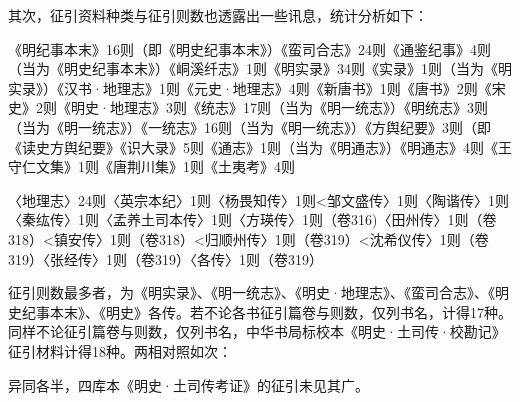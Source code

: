 其次，征引资料种类与征引则数也透露出一些讯息，统计分析如下：

《明纪事本末》16则（即《明史纪事本末》）《蛮司合志》24则《通鉴纪事》4则（当为《明史纪事本末》）《峒溪纤志》1则《明实录》34则《实录》1则（当为《明实录》）《汉书·地理志》1则《元史·地理志》4则《新唐书》1则《唐书》2则《宋史》2则《明史·地理志》3则《统志》17则（当为《明一统志》）《明统志》3则（当为《明一统志》）《一统志》16则（当为《明一统志》）《方舆纪要》3则（即《读史方舆纪要》《识大录》5则《通志》1则（当为《明通志》）《明通志》4则《王守仁文集》1则《唐荆川集》1则《土夷考》4则


\noindent 〈地理志〉24则〈英宗本纪〉1则〈杨畏知传〉1则<邹文盛传〉1则〈陶谐传〉1则〈秦纮传〉1则〈孟养土司本传〉1则〈方瑛传〉1则（卷316)〈田州传〉1则（卷318）<镇安传〉1则（卷318）<归顺州传〉1则（卷319）<沈希仪传〉1则（卷319）〈张经传〉1则（卷319）〈各传〉1则（卷319）

征引则数最多者，为《明实录》、《明一统志》、《明史·地理志》、《蛮司合志》、《明史纪事本末》、《明史》各传。若不论各书征引篇卷与则数，仅列书名，计得17种。同样不论征引篇卷与则数，仅列书名，中华书局标校本《明史·土司传·校勘记》征引材料计得18种。两相对照如次：

\par


\par

\noindent 异同各半，四库本《明史·土司传考证》的征引未见其广。

